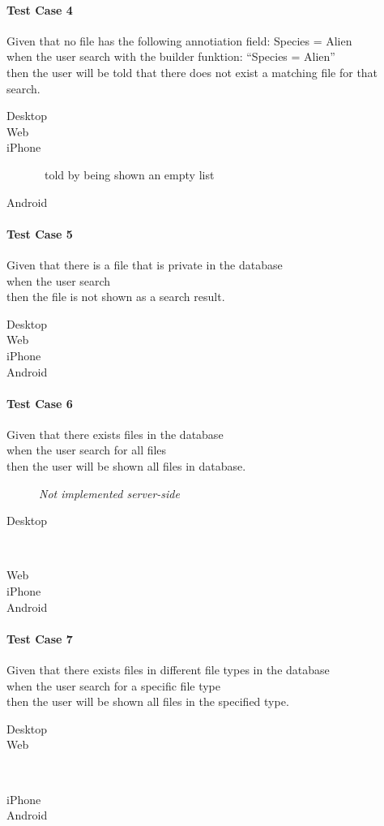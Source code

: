 \paragraph*{Test Case 4}
Given that no file has the following annotiation field: Species = Alien \\ when the user search with the builder funktion: “Species = Alien” \\ then the user will be told that there does not exist a matching file for that search.
\begin{description}
 \item[Desktop]
 \item[Web] 
 \item[iPhone] \cmark\ told by being shown an empty list
 \item[Android]
\end{description}
\paragraph*{Test Case 5}
Given that there is a file that is private in the database \\ when the user search \\ then the file is not shown as a search result.
\begin{description}
 \item[Desktop] \xmark
 \item[Web] \xmark
 \item[iPhone] \xmark
 \item[Android] \xmark
\end{description}
\paragraph*{Test Case 6}
Given that there exists files in the database \\ when the user search for all files \\ then the user will be shown all files in database.
\begin{description}
 \item[] \emph{Not implemented server-side}
 \item[Desktop] \xmark\
 \item[Web] \xmark
 \item[iPhone] \xmark
 \item[Android] \xmark
\end{description}
\paragraph*{Test Case 7}
Given that there exists files in different file types in the database \\ when the user search for a specific file type \\ then the user will be shown all files in the specified type.
\begin{description}
 \item[Desktop]
 \item[Web] \cmark\
 \item[iPhone]
 \item[Android]
\end{description}


